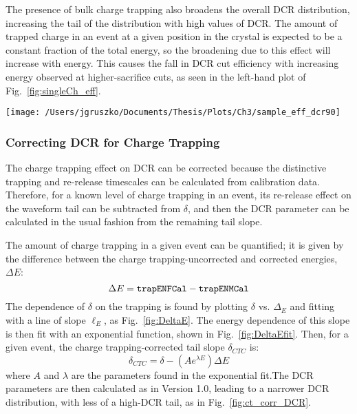 The presence of bulk charge trapping also broadens the overall DCR distribution, increasing the tail of the distribution with high values of DCR. The amount of trapped charge in an event at a given position in the crystal is expected to be a constant fraction of the total energy, so the broadening due to this effect will increase with energy. This causes the fall in DCR cut efficiency with increasing energy observed at higher-sacrifice cuts, as seen in the left-hand plot of Fig.~\ref{fig:singleCh_eff}. 

\begin{figure*}[t]
 \centering
 \texttt{[image: /Users/jgruszko/Documents/Thesis/Plots/Ch3/sample\_eff\_dcr90]}
 \caption[DCR cut efficiency and uncertainties]{Efficiency plots for the 90\% acceptance DCR cut in P42537A, DS3. {\it Left:} DCR cut efficiency. The pulse-shape systematic uncertainty for the channel can be calculated from the values indicated on this plot, and the energy-scale effect is clearly visible. {\it Right:} The charge-trapping-corrected DCR efficiency. The correction has reduced $\sigma_{PS}$ and the overall energy dependence has been corrected, but the efficiency is lower than expected in the full-energy 2614 keV peak. This requires further study.} 
 \label{fig:singleCh_eff}
\end{figure*}

\subsubsection{Correcting DCR for Charge Trapping}
The charge trapping effect on DCR can be corrected because the distinctive trapping and re-release timescales can be calculated from calibration data. Therefore, for a known level of charge trapping in an event, its re-release effect on the waveform tail can be subtracted from $\delta$, and then the DCR parameter can be calculated in the usual fashion from the remaining tail slope. 

The amount of charge trapping in a given event can be quantified; it is given by the difference between the charge trapping-uncorrected and corrected energies, $\Delta E$:
$$\Delta E =  {\tt trapENFCal}-{\tt trapENMCal} $$
The dependence of $\delta$ on the trapping is found by plotting $\delta$ vs. $\Delta_{E}$ and fitting with a line of slope $\ell_{E}$, as Fig.~\ref{fig:DeltaE}. The energy dependence of this slope is then fit with an exponential function, shown in Fig.~\ref{fig:DeltaEfit}. Then, for a given event, the charge trapping-corrected tail slope $\delta_{CTC}$ is:
$$\delta_{CTC} = \delta - (Ae^{\lambda E})\Delta E$$
where $A$ and $\lambda$ are the parameters found in the exponential fit.The DCR parameters are then calculated as in Version 1.0, leading to a narrower DCR distribution, with less of a high-DCR tail, as in Fig.~\ref{fig:ct_corr_DCR}.


